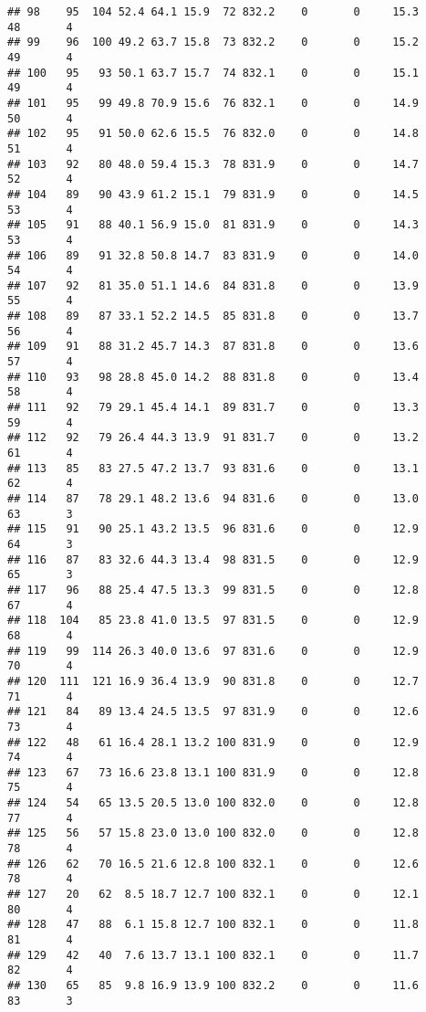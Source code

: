 \documentclass[
]{article}
\begin{document}
\begin{verbatim}
## 98    95  104 52.4 64.1 15.9  72 832.2    0       0     15.3      48       4
## 99    96  100 49.2 63.7 15.8  73 832.2    0       0     15.2      49       4
## 100   95   93 50.1 63.7 15.7  74 832.1    0       0     15.1      49       4
## 101   95   99 49.8 70.9 15.6  76 832.1    0       0     14.9      50       4
## 102   95   91 50.0 62.6 15.5  76 832.0    0       0     14.8      51       4
## 103   92   80 48.0 59.4 15.3  78 831.9    0       0     14.7      52       4
## 104   89   90 43.9 61.2 15.1  79 831.9    0       0     14.5      53       4
## 105   91   88 40.1 56.9 15.0  81 831.9    0       0     14.3      53       4
## 106   89   91 32.8 50.8 14.7  83 831.9    0       0     14.0      54       4
## 107   92   81 35.0 51.1 14.6  84 831.8    0       0     13.9      55       4
## 108   89   87 33.1 52.2 14.5  85 831.8    0       0     13.7      56       4
## 109   91   88 31.2 45.7 14.3  87 831.8    0       0     13.6      57       4
## 110   93   98 28.8 45.0 14.2  88 831.8    0       0     13.4      58       4
## 111   92   79 29.1 45.4 14.1  89 831.7    0       0     13.3      59       4
## 112   92   79 26.4 44.3 13.9  91 831.7    0       0     13.2      61       4
## 113   85   83 27.5 47.2 13.7  93 831.6    0       0     13.1      62       4
## 114   87   78 29.1 48.2 13.6  94 831.6    0       0     13.0      63       3
## 115   91   90 25.1 43.2 13.5  96 831.6    0       0     12.9      64       3
## 116   87   83 32.6 44.3 13.4  98 831.5    0       0     12.9      65       3
## 117   96   88 25.4 47.5 13.3  99 831.5    0       0     12.8      67       4
## 118  104   85 23.8 41.0 13.5  97 831.5    0       0     12.9      68       4
## 119   99  114 26.3 40.0 13.6  97 831.6    0       0     12.9      70       4
## 120  111  121 16.9 36.4 13.9  90 831.8    0       0     12.7      71       4
## 121   84   89 13.4 24.5 13.5  97 831.9    0       0     12.6      73       4
## 122   48   61 16.4 28.1 13.2 100 831.9    0       0     12.9      74       4
## 123   67   73 16.6 23.8 13.1 100 831.9    0       0     12.8      75       4
## 124   54   65 13.5 20.5 13.0 100 832.0    0       0     12.8      77       4
## 125   56   57 15.8 23.0 13.0 100 832.0    0       0     12.8      78       4
## 126   62   70 16.5 21.6 12.8 100 832.1    0       0     12.6      78       4
## 127   20   62  8.5 18.7 12.7 100 832.1    0       0     12.1      80       4
## 128   47   88  6.1 15.8 12.7 100 832.1    0       0     11.8      81       4
## 129   42   40  7.6 13.7 13.1 100 832.1    0       0     11.7      82       4
## 130   65   85  9.8 16.9 13.9 100 832.2    0       0     11.6      83       3

\end{verbatim}
\end{document}
